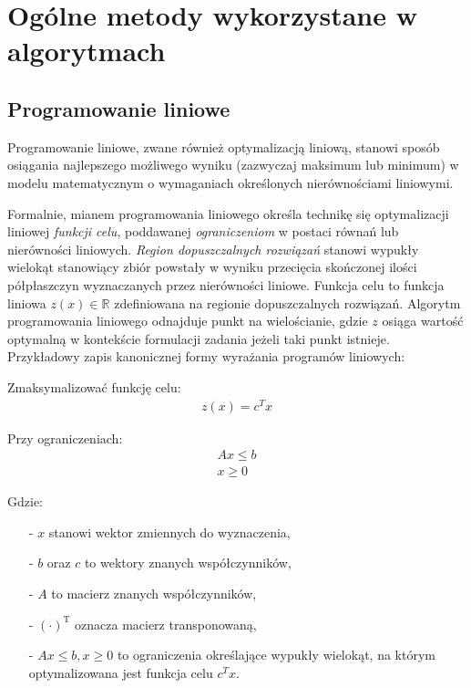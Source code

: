 \section{Ogólne metody wykorzystane w algorytmach}\label{s_methods}

\subsection{Programowanie liniowe}\label{ss_lp}
\par{
  Programowanie liniowe, zwane również optymalizacją liniową, stanowi sposób
  osiągania najlepszego możliwego wyniku (zazwyczaj maksimum lub minimum) w modelu 
  matematycznym o wymaganiach określonych nierównościami liniowymi.
}
\par{
  Formalnie, mianem programowania liniowego określa technikę się optymalizacji 
  liniowej \emph{funkcji celu}, poddawanej \emph{ograniczeniom} w postaci równań 
  lub nierówności liniowych.
  \emph{Region dopuszczalnych rozwiązań} stanowi wypukły wielokąt stanowiący 
  zbiór powstały w wyniku przecięcia skończonej ilości półpłaszczyn wyznaczanych 
  przez nierówności liniowe.
  Funkcja celu to funkcja liniowa $z(x) \in \mathbb{R}$ zdefiniowana na regionie
  dopuszczalnych rozwiązań.
  Algorytm programowania liniowego odnajduje punkt na wielościanie,
  gdzie $z$ osiąga wartość optymalną w kontekście formulacji zadania jeżeli taki
  punkt istnieje. 
  Przykładowy zapis kanonicznej formy wyrażania programów liniowych:\\\par
  Zmaksymalizować funkcję celu:
  \begin{align*}
    z(x)={c^T}x
  \end{align*}\par
  Przy ograniczeniach: \begin{align*}
    Ax \leq b\\
    x\geq 0
  \end{align*}

  Gdzie:
  \begin{itemize}
    \item[-] $x$ stanowi wektor zmiennych do wyznaczenia,
    \item[-] $b$ oraz $c$ to wektory znanych współczynników,
    \item[-] $A$ to macierz znanych współczynników,
    \item[-] ${(\cdot)}^\mathrm{T}$ oznacza macierz transponowaną,
    \item[-] $Ax \leq b, x\geq 0$ to ograniczenia określające wypukły wielokąt,
      na którym optymalizowana jest funkcja celu $c^{T}x$.
  \end{itemize}
}
